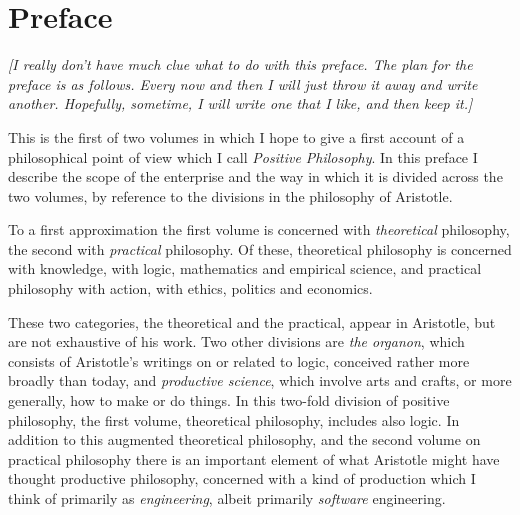 
\newcommand{\listpositionname}{Positions}
\newlistof[chapter]{position}{pos}{\listpositionname}

\newcommand{\position}[2]{%
\refstepcounter{position}
{\paragraph{\textbf{#1 \theposition}} #2}
\addcontentsline{pos}{position}{\protect\numberline{\theposition} #2}\par}



\chapter*{Preface}\label{Preface}

{\it
[I really don't have much clue what to do with this preface.
The plan for the preface is as follows.
Every now and then I will just throw it away and write another.
Hopefully, sometime, I will write one that I like, and then keep it.]
}%

This is the first of two volumes in which I hope to give a first
account of a philosophical point of view which I call \emph{Positive
  Philosophy}.
In this preface I describe the scope of the enterprise and the way in
which it is divided across the two volumes, by reference to the
divisions in the philosophy of Aristotle.

To a first approximation the first volume is concerned with
\emph{theoretical} philosophy, the second with \emph{practical}
philosophy.
Of these, theoretical philosophy is concerned with knowledge, with
logic, mathematics and empirical science, and practical philosophy
with action, with ethics, politics and economics.

These two categories, the theoretical and the practical, appear in
Aristotle, but are not exhaustive of his work.
Two other divisions are \emph{the organon}, which consists of
Aristotle's writings on or related to logic, conceived rather more
broadly than today, and \emph{productive science}, which involve arts
and crafts, or more generally, how to make or do things.
In this two-fold division of positive philosophy, the first volume,
theoretical philosophy, includes also logic.
In addition to this augmented theoretical philosophy, and the second
volume on practical philosophy there is an important element of what
Aristotle might have thought productive philosophy, concerned with a
kind of production which I think of primarily as \emph{engineering},
albeit primarily \emph{software} engineering.




\mainmatter
